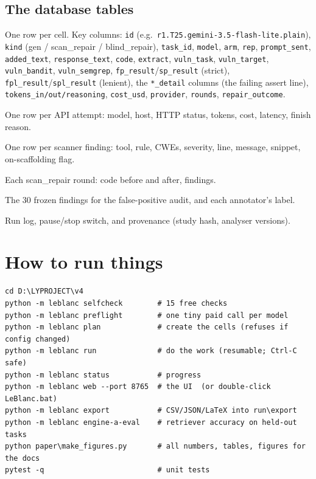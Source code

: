 \documentclass[11pt]{article}
\begin{document}
\subsection{The database tables}
\begin{description}[style=nextline, leftmargin=1.2em]
\item[cells] One row per cell. Key columns: \texttt{id} (e.g.\ \texttt{r1.T25.gemini-3.5-flash-lite.plain}),
  \texttt{kind} (gen / scan\_repair / blind\_repair), \texttt{task\_id}, \texttt{model}, \texttt{arm}, \texttt{rep},
  \texttt{prompt\_sent}, \texttt{added\_text}, \texttt{response\_text}, \texttt{code}, \texttt{extract},
  \texttt{vuln\_task}, \texttt{vuln\_target}, \texttt{vuln\_bandit}, \texttt{vuln\_semgrep},
  \texttt{fp\_result}/\texttt{sp\_result} (strict), \texttt{fpl\_result}/\texttt{spl\_result} (lenient), the
  \texttt{*\_detail} columns (the failing assert line), \texttt{tokens\_in/out/reasoning}, \texttt{cost\_usd},
  \texttt{provider}, \texttt{rounds}, \texttt{repair\_outcome}.
\item[calls] One row per API attempt: model, host, HTTP status, tokens, cost, latency, finish reason.
\item[findings] One row per scanner finding: tool, rule, CWEs, severity, line, message, snippet, on-scaffolding flag.
\item[repair\_rounds] Each scan\_repair round: code before and after, findings.
\item[audit\_sample / audit] The 30 frozen findings for the false-positive audit, and each annotator's label.
\item[events, control, meta] Run log, pause/stop switch, and provenance (study hash, analyser versions).
\end{description}

\section{How to run things}
\begin{lstlisting}
cd D:\LYPROJECT\v4
python -m leblanc selfcheck        # 15 free checks
python -m leblanc preflight        # one tiny paid call per model
python -m leblanc plan             # create the cells (refuses if config changed)
python -m leblanc run              # do the work (resumable; Ctrl-C safe)
python -m leblanc status           # progress
python -m leblanc web --port 8765  # the UI  (or double-click LeBlanc.bat)
python -m leblanc export           # CSV/JSON/LaTeX into run\export
python -m leblanc engine-a-eval    # retriever accuracy on held-out tasks
python paper\make_figures.py       # all numbers, tables, figures for the docs
pytest -q                          # unit tests
\end{lstlisting}
\end{document}

